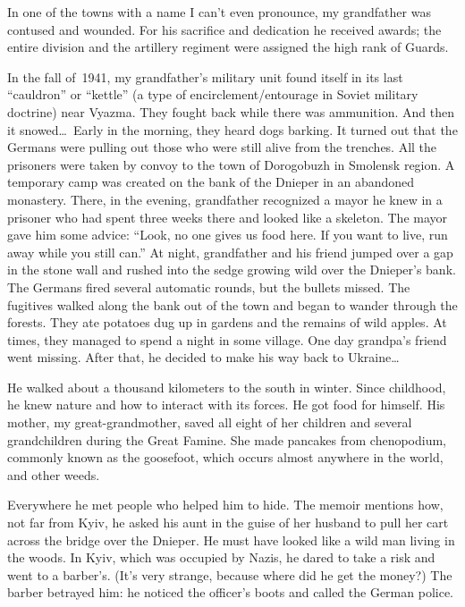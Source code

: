 In one of the towns with a name I can't even pronounce, my grandfather
was contused and wounded. For his sacrifice and dedication he received
awards; the entire division and the artillery regiment were assigned
the high rank of Guards.

In the fall of~1941, my grandfather's military unit found itself in
its last ``cauldron'' or ``kettle'' (a type of encirclement/entourage in
Soviet military doctrine) near Vyazma. They fought back while there
was ammunition. And then it snowed\ldots\ Early in the morning, they
heard dogs barking. It turned out that the Germans were pulling out
those who were still alive from the trenches. All the prisoners were
taken by convoy to the town of Dorogobuzh in Smolensk region. A
temporary camp was created on the bank of the Dnieper in an abandoned
monastery. There, in the evening, grandfather recognized a mayor he
knew in a prisoner who had spent three weeks there and looked like a
skeleton. The mayor gave him some advice: ``Look, no one gives us food
here. If you want to live, run away while you still can.'' At night,
grandfather and his friend jumped over a gap in the stone wall and
rushed into the sedge growing wild over the Dnieper's bank. The
Germans fired several automatic rounds, but the bullets missed. The
fugitives walked along the bank out of the town and began to wander
through the forests. They ate potatoes dug up in gardens and the
remains of wild apples. At times, they managed to spend a night in
some village. One day grandpa's friend went missing. After that, he
decided to make his way back to Ukraine\ldots

He walked about a thousand kilometers to the south in winter. Since
childhood, he knew nature and how to interact with its forces. He got
food for himself. His mother, my great-grandmother, saved all eight of
her children and several grandchildren during the Great Famine. She
made pancakes from chenopodium, commonly known as the goosefoot, which
occurs almost anywhere in the world, and other weeds.

Everywhere he met people who helped him to hide. The memoir mentions
how, not far from Kyiv, he asked his aunt in the guise of her husband
to pull her cart across the bridge over the Dnieper. He must have
looked like a wild man living in the woods. In Kyiv, which was
occupied by Nazis, he dared to take a risk and went to a barber's.
(It's very strange, because where did he get the money?) The barber
betrayed him: he noticed the officer's boots and called the German
police.

